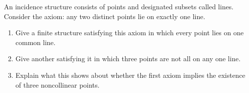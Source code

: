 An incidence structure consists of points and designated subsets called lines. Consider the axiom: any two distinct points lie on exactly one line.
\begin{enumerate}
\item Give a finite structure satisfying this axiom in which every point lies on one common line.
\item Give another satisfying it in which three points are not all on any one line.
\item Explain what this shows about whether the first axiom implies the existence of three noncollinear points.
\end{enumerate}
